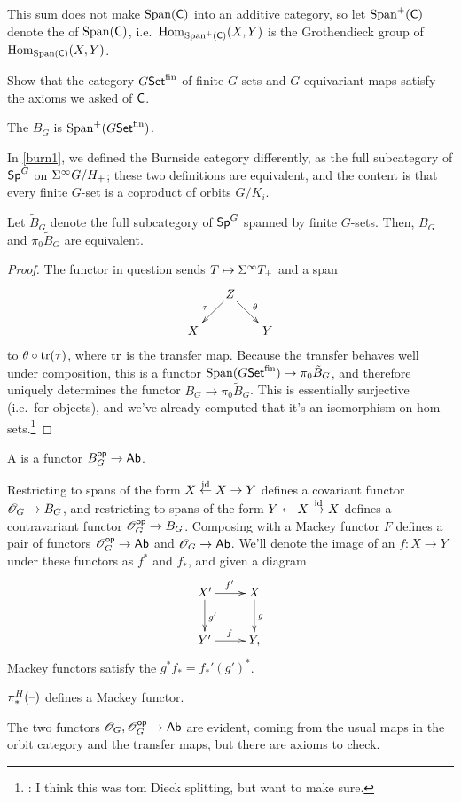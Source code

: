This sum does not make $\operatorname{Span}(\mathsf C)$ into an additive category, so let $\operatorname{Span}^+(\mathsf C)$ denote the  of $\operatorname{Span}(\mathsf C)$, i.e.\ $\operatorname{Hom}_{\operatorname{Span}^+(\mathsf C)}(X,Y)$ is the Grothendieck group of
$\operatorname{Hom}_{\operatorname{Span}(\mathsf C)}(X,Y)$.
\begin{ex}
Show that the category $G\mathsf{Set}^{\mathrm{fin}}$ of finite $G$-sets and $G$-equivariant maps satisfy the axioms we
asked of $\mathsf C$.
\end{ex}
\begin{defn}
\label{burn2}
The  $B_G$ is $\operatorname{Span}^+(G\mathsf{Set}^{\mathrm{fin}})$.
\end{defn}
In \cref{burn1}, we defined the Burnside category differently, as the full subcategory of $\mathsf{Sp}^G$ on $\Sigma^\infty G/H_+$;
these two definitions are equivalent, and the content is that every finite $G$-set is a coproduct of orbits
$G/K_i$.
\begin{prop}
Let $\tilde B_G$ denote the full subcategory of $\mathsf{Sp}^G$ spanned by finite $G$-sets. Then, $B_G$ and $\pi_0\tilde
B_G$ are equivalent.
\end{prop}
\begin{proof}
The functor in question sends $T\mapsto\sus T_+$ and a span
\[\xymatrix@dr{
	Z\ar[r]^\theta\ar[d]_\tau & Y\\
	X
}\]
to $\theta\circ\operatorname{tr}(\tau)$, where $\operatorname{tr}$ is the transfer map. Because the transfer behaves well under composition,
this is a functor $\operatorname{Span}(G\mathsf{Set}^{\mathrm{fin}})\to\pi_0\tilde B_G$, and therefore uniquely determines the functor
$B_G\to\pi_0\tilde B_G$. This is essentially surjective (i.e.\ for objects), and we've already computed that it's
an isomorphism on hom sets.\footnote{\TODO: I think this was tom Dieck splitting, but want to make sure.}
\end{proof}
\begin{defn}
A  is a functor $B_G^{\mathsf{op}}\to\mathsf{Ab}$.
\end{defn}
Restricting to spans of the form $X\stackrel{\mathrm{id}}\gets X\to Y$ defines a covariant functor
$\mathscr O_G\to B_G$, and restricting to spans of the form $Y\gets X\stackrel{\mathrm{id}}\to X$ defines a contravariant functor
$\mathscr O_G^{\mathsf{op}}\to B_G$. Composing with a Mackey functor $F$ defines a pair of functors $\mathscr O_G^{\mathsf{op}}\to\mathsf{Ab}$ and
$\mathscr O_G\to\mathsf{Ab}$. We'll denote the image of an $f\colon X\to Y$ under these functors as $f^*$ and $f_*$, and given a
diagram
\[\xymatrix{
	X'\ar[r]^{f'}\ar[d]^{g'} & X\ar[d]^g\\
	Y'\ar[r]^f & Y,
}\]
Mackey functors satisfy the  $g^*f_* = f_*'(g')^*$.
\begin{prop}
$\pi_*^H(\text{--})$ defines a Mackey functor.
\end{prop}
The two functors $\mathscr O_G,\mathscr O_G^{\mathsf{op}}\to\mathsf{Ab}$ are evident, coming from the usual maps in the orbit category and the
transfer maps, but there are axioms to check.

